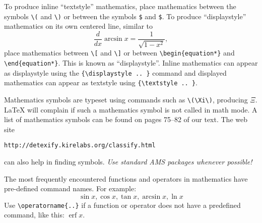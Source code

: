 \documentclass[11pt]{article}
\begin{document}
To produce inline ``textstyle'' mathematics, place mathematics between the
symbols \verb`\(` and \verb`\)` or between the symbols \verb`$` and \verb`$`.
To produce ``displaystyle'' mathematics on its own centered line, similar to
\begin{equation*}
  \frac{d}{dx} \arcsin x = \frac{1}{\sqrt{1 - x^2}},
\end{equation*}
place mathematics between \verb`\[` and \verb`\]` or between
\verb`\begin{equation*}` and \verb`\end{equation*}`.  This is known as
``displaystyle''.  Inline mathematics can appear as displaystyle using the
\verb!{\displaystyle .. }! command and displayed mathematics can appear as
textstyle using \verb`{\textstyle .. }`.

Mathematics symbols are typeset using commands such as \verb~\(\Xi\)~,
producing \(\Xi\).  \LaTeX{} will complain if such a mathematics symbol is not
called in math mode.  A list of mathematics symbols can be found on pages 75--82
of our text.  The web site
\begin{center}
  \texttt{http://detexify.kirelabs.org/classify.html}
\end{center}
can also help in finding symbols.  \emph{Use standard AMS packages whenever
  possible!}

The most frequently encountered functions and operators in mathematics have
pre-defined command names.  For example:
\[
  \sin x, \cos x, \tan x, \arcsin x, \ln x
\]
Use \verb~\operatorname{..}~ if a function or operator does not have a
predefined command, like this: \(\operatorname{erf}x\).
\end{document}
